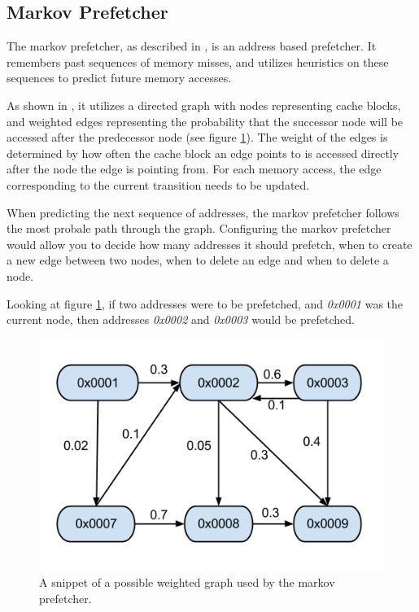 \subsection{Markov Prefetcher}
\label{sec:markovPrefetcher}
The markov prefetcher, as described in \cite{Grannas}, is an address based prefetcher. It remembers past sequences of memory misses, and utilizes heuristics on these sequences to predict future memory accesses.

As shown in \cite{Joseph}, it utilizes a directed graph with nodes representing cache blocks, and weighted edges representing the probability that the successor node will be accessed after the predecessor node (see figure \ref{fig:markov}). The weight of the edges is determined by how often the cache block an edge points to is accessed directly after the node the edge is pointing from. For each memory access, the edge corresponding to the current transition needs to be updated. 

When predicting the next sequence of addresses, the markov prefetcher follows the most probale path through the graph. Configuring the markov prefetcher would allow you to decide how many addresses it should prefetch, when to create a new edge between two nodes, when to delete an edge and when to delete a node.

Looking at figure \ref{fig:markov}, if two addresses were to be prefetched, and \emph{0x0001} was the current node, then addresses \emph{0x0002} and \emph{0x0003} would be prefetched.

\begin{figure}[H]
\includegraphics[scale=0.5]{./figures/markov}
\caption{\label{fig:markov}A snippet of a possible weighted graph used by the markov prefetcher.}
\end{figure}

